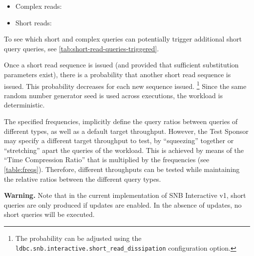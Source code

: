 \begin{itemize}
\item Complex reads:
\item Short reads:
\end{itemize}

To see which short and complex queries can potentially trigger additional short query queries, see \autoref{tab:short-read-queries-triggered}.

Once a short read sequence is issued (and provided that sufficient substitution parameters 
exist), there is a probability that another short read sequence is issued. This probability decreases for each new sequence issued.%
\footnote{The probability can be adjusted using the \texttt{ldbc.snb.interactive.short\_read\_dissipation} configuration option.}
Since the same random number generator seed is used across
executions, the workload is deterministic.



The specified frequencies, implicitly define the query ratios between queries
of different types, as well as a default target throughput. However, the Test
Sponsor may specify a different target throughput to test,  by ``squeezing''
together or ``stretching'' apart the queries of the workload. This is
achieved by means of the ``Time Compression Ratio'' that is multiplied by the
frequencies (see \autoref{table:freqs}).  Therefore, different
throughputs can be tested while maintaining the relative ratios between the
different query types.

\textbf{Warning.} Note that in the current implementation of SNB Interactive v1, short queries are only produced if updates are enabled. In the absence of updates, no short queries will be executed.
